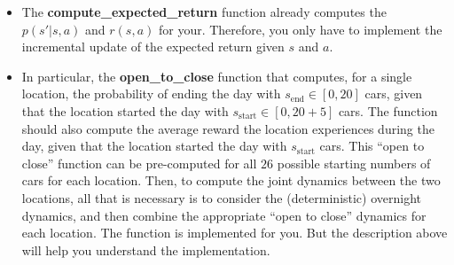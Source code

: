 \documentclass{article}
\begin{document}
\begin{enumerate}
\begin{itemize}
\begin{itemize}
			            \item The \textbf{compute\_expected\_return} function already computes the $p(s'|s,a)$ and $r(s, a)$ for your. Therefore, you only have to implement the incremental update of the expected return given $s$ and $a$.
			            \item In particular, the \textbf{open\_to\_close} function that computes, for a single location, the probability of ending the day with $s_\text{end} \in [0, 20]$ cars, given that the location started the day with $s_\text{start} \in [0, 20 + 5]$ cars. The function should also compute the average reward the location experiences during the day, given that the location started the day with $s_\text{start}$ cars. This ``open to close'' function can be pre-computed for all $26$ possible starting numbers of cars for each location. Then, to compute the joint dynamics between the two locations, all that is necessary is to consider the (deterministic) overnight dynamics, and then combine the appropriate ``open to close'' dynamics for each location. The function is implemented for you. But the description above will help you understand the implementation.
		            \end{itemize}
	      \end{itemize}


\end{enumerate}
\end{document}
